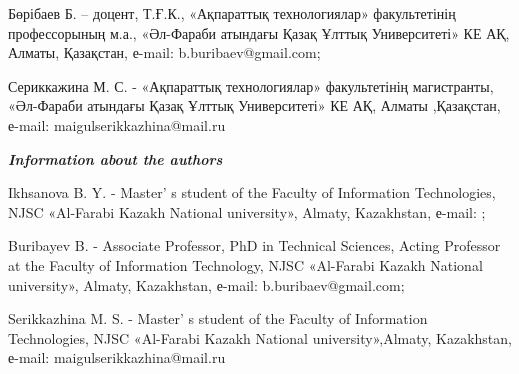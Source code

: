 \href{https://orcid.org/0009-0007-9202-9650}{}

Бөрібаев Б. -- доцент, Т.Ғ.К., «Ақпараттық технологиялар» факультетінің
профессорының м.а., «Әл-Фараби атындағы Қазақ Ұлттық Университеті» КЕ
АҚ, Алматы, Қазақстан, е-mail: b.buribaev@gmail.com;

\href{https://orcid.org/0009-0004-8866-9581}{}

Сериккажина М. С. - «Ақпараттық технологиялар» факультетінің
магистранты, «Әл-Фараби атындағы Қазақ Ұлттық Университеті» КЕ АҚ,
Алматы ,Қазақстан, е-mail: maigulserikkazhina@mail.ru

\href{https://orcid.org/0009-0001-0280-3099}{}

\emph{{\bfseries Information about the authors}}

Ikhsanova B. Y. - Master' s student of the Faculty of
Information Technologies, NJSC «Al-Farabi Kazakh National university»,
Almaty, Kazakhstan, е-mail:
\href{mailto:botagozikhsanova@gmail.com}{};

Buribayev B. - Associate Professor, PhD in Technical Sciences, Acting
Professor at the Faculty of Information Technology, NJSC «Al-Farabi
Kazakh National university», Almaty, Kazakhstan, е-mail:
b.buribaev@gmail.com;

Serikkazhina M. S. - Master' s student of the Faculty of
Information Technologies, NJSC «Al-Farabi Kazakh National
university»,Almaty, Kazakhstan, е-mail: maigulserikkazhina@mail.ru\